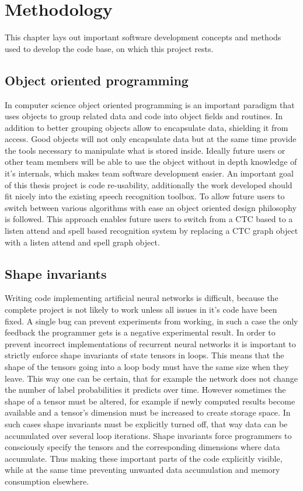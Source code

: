 \chapter{Methodology}
\label{cha:methods}
This chapter lays out important software development concepts and methods used to develop the code base, on which this project rests.

\section{Object oriented programming}
In computer science object oriented programming is an important paradigm that uses objects to group related data and code into object fields and routines. In addition to better grouping objects allow to encapsulate data, shielding it from access. Good objects will not only encapsulate data but at the same time provide the tools necessary to manipulate what is stored inside. Ideally future users or other team members will be able to use the object without in depth knowledge of it's internals, which makes team software development easier.  
An important goal of this thesis project is code re-usability, additionally the work developed should fit nicely into the existing speech recognition toolbox. To allow future users to switch between various algorithms with ease an object oriented design philosophy is followed. This approach enables future users to switch from a CTC based to a listen attend and spell based recognition system by replacing a CTC graph object with a listen attend and spell graph object.

\section{Shape invariants}
Writing code implementing artificial neural networks is difficult, because the complete project is not likely to work unless all issues in it's code have been fixed. A single bug can prevent experiments from working, in such a case the only feedback the programmer gets is a negative experimental result. In order to prevent incorrect implementations of recurrent neural networks it is important to strictly enforce shape invariants of state tensors in loops. This means that the shape of the tensors going into a loop body must have the same size when they leave. This way one can be certain, that for example the network does not change the number of label probabilities it predicts over time.
However sometimes the shape of a tensor must be altered, for example if newly computed results become available and a tensor's dimension must be increased to create storage space. 
In such cases shape invariants must be explicitly turned off, that way data can be accumulated over several loop iterations. Shape invariants force programmers to consciously specify the tensors and the corresponding dimensions where data accumulate. Thus making these important parts of the code explicitly visible, while at the same time preventing unwanted data accumulation and memory consumption elsewhere.  


